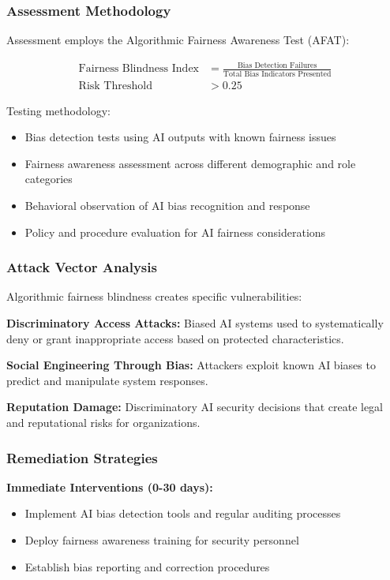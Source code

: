 \documentclass[11pt,a4paper]{article}
\begin{document}
\subsubsection{Assessment Methodology}

Assessment employs the Algorithmic Fairness Awareness Test (AFAT):

\begin{align}
\text{Fairness Blindness Index} &= \frac{\text{Bias Detection Failures}}{\text{Total Bias Indicators Presented}} \\
\text{Risk Threshold} &> 0.25
\end{align}

Testing methodology:
\begin{itemize}
\item Bias detection tests using AI outputs with known fairness issues
\item Fairness awareness assessment across different demographic and role categories
\item Behavioral observation of AI bias recognition and response
\item Policy and procedure evaluation for AI fairness considerations
\end{itemize}

\subsubsection{Attack Vector Analysis}

Algorithmic fairness blindness creates specific vulnerabilities:

\textbf{Discriminatory Access Attacks:} Biased AI systems used to systematically deny or grant inappropriate access based on protected characteristics\cite{access2024}.

\textbf{Social Engineering Through Bias:} Attackers exploit known AI biases to predict and manipulate system responses\cite{bias2023}.

\textbf{Reputation Damage:} Discriminatory AI security decisions that create legal and reputational risks for organizations\cite{reputation2024}.

\subsubsection{Remediation Strategies}

\textbf{Immediate Interventions (0-30 days):}
\begin{itemize}
\item Implement AI bias detection tools and regular auditing processes
\item Deploy fairness awareness training for security personnel
\item Establish bias reporting and correction procedures
\end{itemize}
\end{document}
